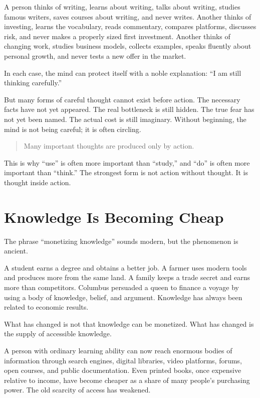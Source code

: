 A person thinks of writing, learns about writing, talks about writing, studies famous writers, saves courses about writing, and never writes. Another thinks of investing, learns the vocabulary, reads commentary, compares platforms, discusses risk, and never makes a properly sized first investment. Another thinks of changing work, studies business models, collects examples, speaks fluently about personal growth, and never tests a new offer in the market.

In each case, the mind can protect itself with a noble explanation: ``I am still thinking carefully.''

But many forms of careful thought cannot exist before action. The necessary facts have not yet appeared. The real bottleneck is still hidden. The true fear has not yet been named. The actual cost is still imaginary. Without beginning, the mind is not being careful; it is often circling.

\begin{quote}
Many important thoughts are produced only by action.
\end{quote}

This is why ``use'' is often more important than ``study,'' and ``do'' is often more important than ``think.'' The strongest form is not action without thought. It is thought inside action.

\section*{Knowledge Is Becoming Cheap}

The phrase ``monetizing knowledge'' sounds modern, but the phenomenon is ancient.

A student earns a degree and obtains a better job. A farmer uses modern tools and produces more from the same land. A family keeps a trade secret and earns more than competitors. Columbus persuaded a queen to finance a voyage by using a body of knowledge, belief, and argument. Knowledge has always been related to economic results.

What has changed is not that knowledge can be monetized. What has changed is the supply of accessible knowledge.

A person with ordinary learning ability can now reach enormous bodies of information through search engines, digital libraries, video platforms, forums, open courses, and public documentation. Even printed books, once expensive relative to income, have become cheaper as a share of many people's purchasing power. The old scarcity of access has weakened.

